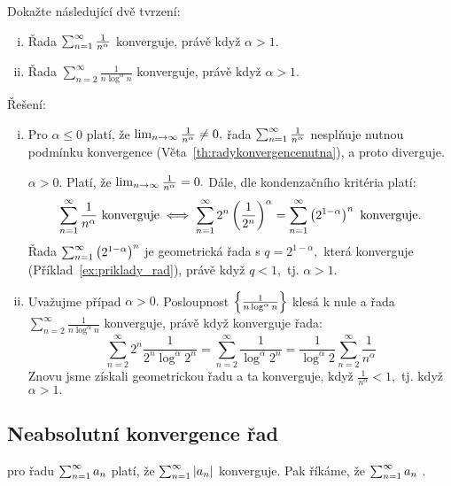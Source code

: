 \begin{example}
    Dokažte následující dvě tvrzení:
    \begin{enumerate}[(i)]
        \item Řada $\sum_{n=1}^\infty \frac{1}{n^\alpha}$ konverguje, právě když 
            $\alpha > 1.$
        \item Řada $\sum_{n=2}^\infty \frac{1}{n\log^\alpha n}$ konverguje,
            právě když $\alpha > 1.$
    \end{enumerate}

    Řešení:
    \begin{enumerate}[(i)]
        \item
            Pro $\alpha \leq 0$ platí, že $\lim_{n \to \infty} \frac{1}{n^\alpha} \neq 0,$ řada
            $\sum_{n=1}^\infty \frac{1}{n^\alpha}$ nesplňuje nutnou podmínku konvergence 
            (Věta~\ref{th:radykonvergencenutna}), a proto diverguje.

            \Necht $\alpha > 0.$ Platí, že $\lim_{n \to \infty} \frac{1}{n^\alpha} = 0.$ Dále, dle
            kondenzačního kritéria platí:
            $$\sum_{n=1}^\infty \frac{1}{n^\alpha} \text{ konverguje}
            \iff \sum_{n=1}^\infty 2^n\left(\frac{1}{2^n}\right)^\alpha 
            = \sum_{n=1}^\infty \left(2^{1-\alpha}\right)^n \text{ konverguje}.$$
            Řada $\sum_{n=1}^\infty \left(2^{1-\alpha}\right)^n$ je geometrická řada s 
            $q = 2^{1-\alpha},$ která konverguje (Příklad~\ref{ex:priklady_rad}), 
            právě když $q<1,$ tj. $\alpha > 1.$

        \item Uvažujme případ $\alpha > 0.$ Posloupnost 
            $\left\{\frac{1}{n\log^\alpha n}\right\}$ klesá k nule a řada 
            $\sum_{n=2}^\infty \frac{1}{n\log^\alpha n}$ konverguje, právě když 
            konverguje řada:
            $$\sum_{n=2}^\infty 2^n \frac{1}{2^n\log^\alpha 2^n} 
            = \sum_{n=2}^\infty \frac{1}{\log^\alpha 2^n} 
            = \frac{1}{\log^\alpha 2} \sum_{n=2}^\infty \frac{1}{n^\alpha} 
            $$
            Znovu jsme získali geometrickou řadu a ta konverguje, když 
            $\frac{1}{n^\alpha} < 1,$ tj. když $\alpha > 1.$
    \end{enumerate}
\end{example}

\subsection{Neabsolutní konvergence řad}

\begin{definition}
    \Necht pro řadu $\sum_{n=1}^\infty a_n$ platí, že $\sum_{n=1}^\infty |a_n|$ konverguje. Pak říkáme,
    že $\sum_{n=1}^\infty a_n$ .
\end{definition}

